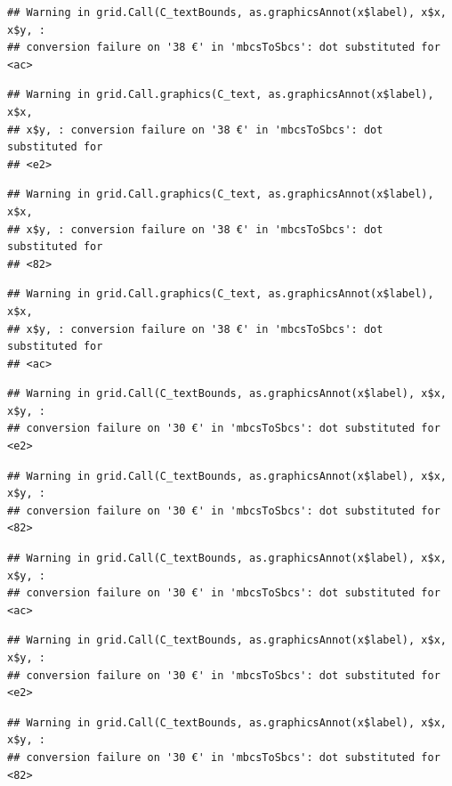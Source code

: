 \documentclass[]{gitbook}
\begin{document}
\begin{verbatim}
## Warning in grid.Call(C_textBounds, as.graphicsAnnot(x$label), x$x, x$y, :
## conversion failure on '38 €' in 'mbcsToSbcs': dot substituted for <ac>
\end{verbatim}

\begin{verbatim}
## Warning in grid.Call.graphics(C_text, as.graphicsAnnot(x$label), x$x,
## x$y, : conversion failure on '38 €' in 'mbcsToSbcs': dot substituted for
## <e2>
\end{verbatim}

\begin{verbatim}
## Warning in grid.Call.graphics(C_text, as.graphicsAnnot(x$label), x$x,
## x$y, : conversion failure on '38 €' in 'mbcsToSbcs': dot substituted for
## <82>
\end{verbatim}

\begin{verbatim}
## Warning in grid.Call.graphics(C_text, as.graphicsAnnot(x$label), x$x,
## x$y, : conversion failure on '38 €' in 'mbcsToSbcs': dot substituted for
## <ac>
\end{verbatim}

\begin{verbatim}
## Warning in grid.Call(C_textBounds, as.graphicsAnnot(x$label), x$x, x$y, :
## conversion failure on '30 €' in 'mbcsToSbcs': dot substituted for <e2>
\end{verbatim}

\begin{verbatim}
## Warning in grid.Call(C_textBounds, as.graphicsAnnot(x$label), x$x, x$y, :
## conversion failure on '30 €' in 'mbcsToSbcs': dot substituted for <82>
\end{verbatim}

\begin{verbatim}
## Warning in grid.Call(C_textBounds, as.graphicsAnnot(x$label), x$x, x$y, :
## conversion failure on '30 €' in 'mbcsToSbcs': dot substituted for <ac>
\end{verbatim}

\begin{verbatim}
## Warning in grid.Call(C_textBounds, as.graphicsAnnot(x$label), x$x, x$y, :
## conversion failure on '30 €' in 'mbcsToSbcs': dot substituted for <e2>
\end{verbatim}

\begin{verbatim}
## Warning in grid.Call(C_textBounds, as.graphicsAnnot(x$label), x$x, x$y, :
## conversion failure on '30 €' in 'mbcsToSbcs': dot substituted for <82>
\end{verbatim}
\end{document}
